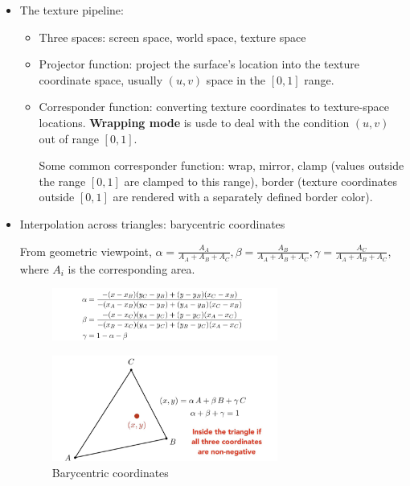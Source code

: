 \documentclass{article}
\begin{document}
\begin{itemize}

    \item The texture pipeline:
    \begin{itemize}
        \item Three spaces: screen space, world space, texture space
        \item Projector function: project the surface's location into the texture coordinate space, usually $(u,v)$ space in the $[0,1]$ range.
        \item Corresponder function: converting texture coordinates to texture-space locations. \textbf{Wrapping mode} is usde to deal with the condition $(u,v)$ out of range $[0,1]$.
        
        Some common corresponder function: wrap, mirror, clamp (values outside the range $[0,1]$ are clamped to this range), border (texture coordinates outside $[0,1]$ are rendered with a separately defined border color).
    \end{itemize}
    
    
    \item Interpolation across triangles: barycentric coordinates
    
    From geometric viewpoint, $\alpha=\frac{A_A}{A_A+A_B+A_C},\beta=\frac{A_B}{A_A+A_B+A_C},\gamma=\frac{A_C}{A_A+A_B+A_C}$, where $A_i$ is the corresponding area.
    
    \begin{figure}[H]
        \centering
        \includegraphics[width=0.7\textwidth]{imgs/barycentric_formula.jpeg}
    \end{figure}

    \begin{figure}[H]
        \centering
        \includegraphics[width=0.7\textwidth]{imgs/barycentric.jpeg}
        \caption{Barycentric coordinates}
    \end{figure}
    

\end{itemize}
\end{document}
